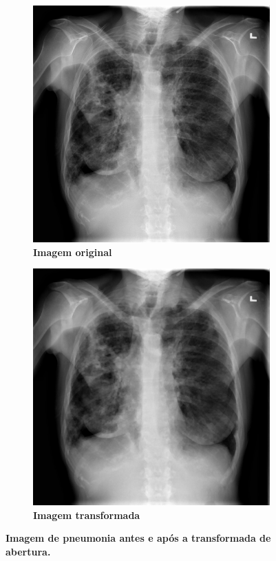 \documentclass[
12pt,        %
oneside,     %
a4paper,     %
english,       %
brazil        %
%
%
]{ppgca}
\begin{document}
\begin{figure}[H]
\centering
    \begin{subfigure}[b]{0.45\textwidth}
        \includegraphics[width=\textwidth]{pneumo1.png}
        \centering
        \caption{\textbf{Imagem original}}
        \label{fig:pneumo1antes}
    \end{subfigure}
    \hfill
    \begin{subfigure}[b]{0.45\textwidth}
        \includegraphics[width=\textwidth]{pneumo1opening.png}
        \centering
        \caption{\textbf{{Imagem transformada}}}
        \label{fig:pneumo1opening}
    \end{subfigure}
    \caption{\textbf{{Imagem de pneumonia antes e após a transformada de abertura.}}}
    \label{fig:pneumoopening}
\end{figure}
\end{document}
